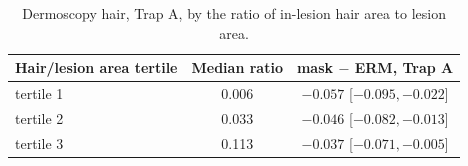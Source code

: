 \begin{table}[H]\centering\small
\caption{Dermoscopy hair, Trap A, by the ratio of in-lesion hair area to lesion area.}\label{tab:ratio}
\begin{tabular}{lcc}\toprule
Hair/lesion area tertile & Median ratio & mask $-$ ERM, Trap A \\\midrule
tertile 1 & 0.006 & $-0.057$ [$-0.095, -0.022$] \\
tertile 2 & 0.033 & $-0.046$ [$-0.082, -0.013$] \\
tertile 3 & 0.113 & $-0.037$ [$-0.071, -0.005$] \\
\bottomrule\end{tabular}
\end{table}
